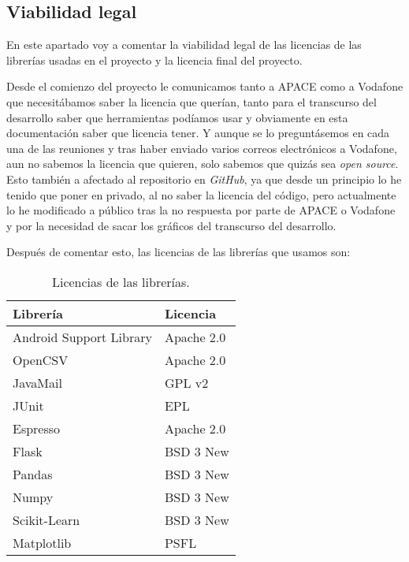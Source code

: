\subsection{Viabilidad legal}
En este apartado voy a comentar la viabilidad legal de las licencias de las librerías usadas en el proyecto y la licencia final del proyecto.

Desde el comienzo del proyecto le comunicamos tanto a APACE como a Vodafone que necesitábamos saber la licencia que querían, tanto para el transcurso del desarrollo saber que herramientas podíamos usar y obviamente en esta documentación saber que licencia tener. Y aunque se lo preguntásemos en cada una de las reuniones y tras haber enviado varios correos electrónicos a Vodafone, aun no sabemos la licencia que quieren, solo sabemos que quizás sea \textit{open source}. Esto también a afectado al repositorio en \textit{GitHub}, ya que desde un principio lo he tenido que poner en privado, al no saber la licencia del código, pero actualmente lo he modificado a público tras la no respuesta por parte de APACE o Vodafone y por la necesidad de sacar los gráficos del transcurso del desarrollo.

Después de comentar esto, las licencias de las librerías que usamos son:

\begin{table}[H]
	\centering
	\begin{tabular}{ll}
		\toprule
		\textbf{Librería}       & \textbf{Licencia} \\ \hline
		Android Support Library & Apache 2.0        \\
		OpenCSV                 & Apache 2.0        \\
		JavaMail                & GPL v2            \\
		JUnit                   & EPL               \\
		Espresso                & Apache 2.0        \\
		Flask                   & BSD 3 New              \\
		Pandas                  & BSD 3 New            \\
		Numpy                   & BSD 3 New           \\
		Scikit-Learn            & BSD 3 New   \\
		Matplotlib              & PSFL              \\ \bottomrule
	\end{tabular}
	\caption{Licencias de las librerías.}
\end{table}


